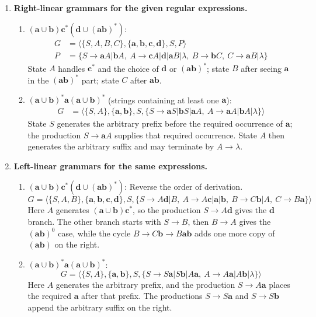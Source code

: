\begin{enumerate}[{8.}1. ]
\item \textbf{Right-linear grammars for the given regular expressions.}

\begin{enumerate}
\item $(\pmb{a}\cup\pmb{b})\pmb{c}^*(\pmb{d}\cup(\pmb{ab})^*)$:
\begin{align*}
G &= \langle\{S,A,B,C\},\{\pmb{a},\pmb{b},\pmb{c},\pmb{d}\},S,P\rangle \\
P &= \{S\to\pmb{a}A|\pmb{b}A,\ A\to\pmb{c}A|\pmb{d}|\pmb{a}B|\lambda,\ B\to\pmb{b}C,\ C\to\pmb{a}B|\lambda\}
\end{align*}
State $A$ handles $\pmb{c}^*$ and the choice of $\pmb{d}$ or $(\pmb{ab})^*$; state $B$ after seeing $\pmb{a}$ in the $(\pmb{ab})^*$ part; state $C$ after $\pmb{ab}$.

\item $(\pmb{a}\cup\pmb{b})^*\pmb{a}(\pmb{a}\cup\pmb{b})^*$ (strings containing at least one $\pmb{a}$):
\begin{align*}
G &= \langle\{S,A\},\{\pmb{a},\pmb{b}\},S,\{S\to\pmb{a}S|\pmb{b}S|\pmb{a}A,\ A\to\pmb{a}A|\pmb{b}A|\lambda\}\rangle
\end{align*}
State $S$ generates the arbitrary prefix before the required occurrence of
$\pmb{a}$; the production $S\to\pmb{a}A$ supplies that required occurrence.
State $A$ then generates the arbitrary suffix and may terminate by
$A\to\lambda$.
\end{enumerate}

\item \textbf{Left-linear grammars for the same expressions.}

\begin{enumerate}
\item $(\pmb{a}\cup\pmb{b})\pmb{c}^*(\pmb{d}\cup(\pmb{ab})^*)$: Reverse the order of derivation.
\[
G = \langle\{S,A,B\},\{\pmb{a},\pmb{b},\pmb{c},\pmb{d}\},S,
\{S\to A\pmb{d}|B,\ A\to A\pmb{c}|\pmb{a}|\pmb{b},\ B\to C\pmb{b}|A,\ C\to B\pmb{a}\}\rangle
\]
Here $A$ generates $(\pmb{a}\cup\pmb{b})\pmb{c}^*$, so the production
$S\to A\pmb{d}$ gives the $\pmb{d}$ branch.  The other branch starts with
$S\to B$, then $B\to A$ gives the $(\pmb{ab})^0$ case, while the cycle
$B\to C\pmb{b}\to B\pmb{ab}$ adds one more copy of $(\pmb{ab})$ on the right.

\item $(\pmb{a}\cup\pmb{b})^*\pmb{a}(\pmb{a}\cup\pmb{b})^*$:
\[
G = \langle\{S,A\},\{\pmb{a},\pmb{b}\},S,\{S\to S\pmb{a}|S\pmb{b}|A\pmb{a},\ A\to A\pmb{a}|A\pmb{b}|\lambda\}\rangle
\]
Here $A$ generates the arbitrary prefix, and the production $S\to A\pmb{a}$
places the required $\pmb{a}$ after that prefix.  The productions
$S\to S\pmb{a}$ and $S\to S\pmb{b}$ append the arbitrary suffix on the right.
\end{enumerate}


\end{enumerate}

